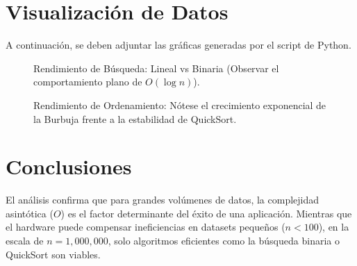 \documentclass[12pt,a4paper]{article}
\begin{document}
\section{Visualización de Datos}
A continuación, se deben adjuntar las gráficas generadas por el script de Python.

\begin{figure}[H]
    \centering
    \caption{Rendimiento de Búsqueda: Lineal vs Binaria (Observar el comportamiento plano de $O(\log n)$).}
\end{figure}

\begin{figure}[H]
    \centering
    \caption{Rendimiento de Ordenamiento: Nótese el crecimiento exponencial de la Burbuja frente a la estabilidad de QuickSort.}
\end{figure}

\section{Conclusiones}
El análisis confirma que para grandes volúmenes de datos, la complejidad asintótica ($O$) es el factor determinante del éxito de una aplicación. Mientras que el hardware puede compensar ineficiencias en datasets pequeños ($n < 100$), en la escala de $n=1,000,000$, solo algoritmos eficientes como la búsqueda binaria o QuickSort son viables.
\end{document}
